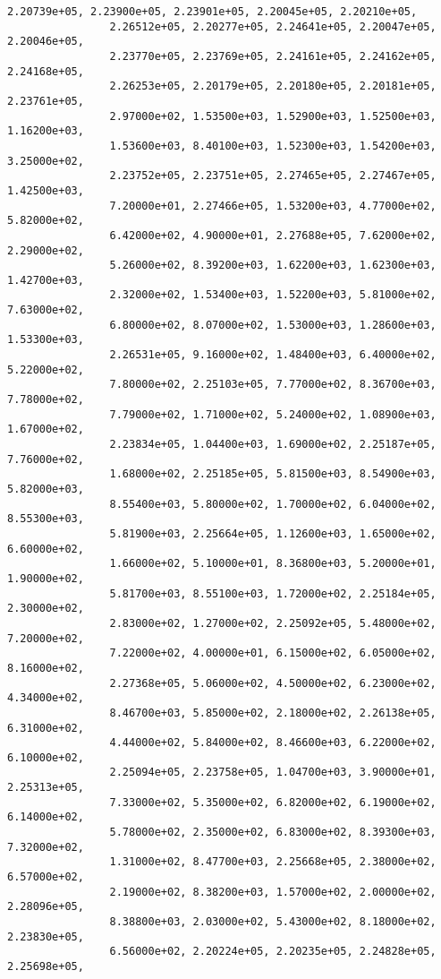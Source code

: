 \documentclass[11pt]{article}
\begin{document}
\begin{Verbatim}[commandchars=\\\{\}]
                2.20739e+05, 2.23900e+05, 2.23901e+05, 2.20045e+05, 2.20210e+05,
                2.26512e+05, 2.20277e+05, 2.24641e+05, 2.20047e+05, 2.20046e+05,
                2.23770e+05, 2.23769e+05, 2.24161e+05, 2.24162e+05, 2.24168e+05,
                2.26253e+05, 2.20179e+05, 2.20180e+05, 2.20181e+05, 2.23761e+05,
                2.97000e+02, 1.53500e+03, 1.52900e+03, 1.52500e+03, 1.16200e+03,
                1.53600e+03, 8.40100e+03, 1.52300e+03, 1.54200e+03, 3.25000e+02,
                2.23752e+05, 2.23751e+05, 2.27465e+05, 2.27467e+05, 1.42500e+03,
                7.20000e+01, 2.27466e+05, 1.53200e+03, 4.77000e+02, 5.82000e+02,
                6.42000e+02, 4.90000e+01, 2.27688e+05, 7.62000e+02, 2.29000e+02,
                5.26000e+02, 8.39200e+03, 1.62200e+03, 1.62300e+03, 1.42700e+03,
                2.32000e+02, 1.53400e+03, 1.52200e+03, 5.81000e+02, 7.63000e+02,
                6.80000e+02, 8.07000e+02, 1.53000e+03, 1.28600e+03, 1.53300e+03,
                2.26531e+05, 9.16000e+02, 1.48400e+03, 6.40000e+02, 5.22000e+02,
                7.80000e+02, 2.25103e+05, 7.77000e+02, 8.36700e+03, 7.78000e+02,
                7.79000e+02, 1.71000e+02, 5.24000e+02, 1.08900e+03, 1.67000e+02,
                2.23834e+05, 1.04400e+03, 1.69000e+02, 2.25187e+05, 7.76000e+02,
                1.68000e+02, 2.25185e+05, 5.81500e+03, 8.54900e+03, 5.82000e+03,
                8.55400e+03, 5.80000e+02, 1.70000e+02, 6.04000e+02, 8.55300e+03,
                5.81900e+03, 2.25664e+05, 1.12600e+03, 1.65000e+02, 6.60000e+02,
                1.66000e+02, 5.10000e+01, 8.36800e+03, 5.20000e+01, 1.90000e+02,
                5.81700e+03, 8.55100e+03, 1.72000e+02, 2.25184e+05, 2.30000e+02,
                2.83000e+02, 1.27000e+02, 2.25092e+05, 5.48000e+02, 7.20000e+02,
                7.22000e+02, 4.00000e+01, 6.15000e+02, 6.05000e+02, 8.16000e+02,
                2.27368e+05, 5.06000e+02, 4.50000e+02, 6.23000e+02, 4.34000e+02,
                8.46700e+03, 5.85000e+02, 2.18000e+02, 2.26138e+05, 6.31000e+02,
                4.44000e+02, 5.84000e+02, 8.46600e+03, 6.22000e+02, 6.10000e+02,
                2.25094e+05, 2.23758e+05, 1.04700e+03, 3.90000e+01, 2.25313e+05,
                7.33000e+02, 5.35000e+02, 6.82000e+02, 6.19000e+02, 6.14000e+02,
                5.78000e+02, 2.35000e+02, 6.83000e+02, 8.39300e+03, 7.32000e+02,
                1.31000e+02, 8.47700e+03, 2.25668e+05, 2.38000e+02, 6.57000e+02,
                2.19000e+02, 8.38200e+03, 1.57000e+02, 2.00000e+02, 2.28096e+05,
                8.38800e+03, 2.03000e+02, 5.43000e+02, 8.18000e+02, 2.23830e+05,
                6.56000e+02, 2.20224e+05, 2.20235e+05, 2.24828e+05, 2.25698e+05,

\end{Verbatim}
\end{document}
